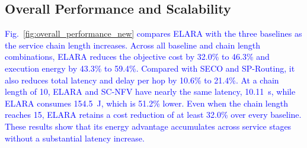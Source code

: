 \documentclass[10pt, conference, letterpaper]{IEEEtran}
\begin{document}
\subsection{Overall Performance and Scalability}

\textcolor{blue}{Fig.~\ref{fig:overall_performance_new} compares ELARA with the three baselines as the service chain length increases. Across all baseline and chain length combinations, ELARA reduces the objective cost by 32.0\% to 46.3\% and execution energy by 43.3\% to 59.4\%. Compared with SECO and SP-Routing, it also reduces total latency and delay per hop by 10.6\% to 21.4\%. At a chain length of 10, ELARA and SC-NFV have nearly the same latency, 10.11~s, while ELARA consumes 154.5~J, which is 51.2\% lower. Even when the chain length reaches 15, ELARA retains a cost reduction of at least 32.0\% over every baseline. These results show that its energy advantage accumulates across service stages without a substantial latency increase.}
\end{document}
